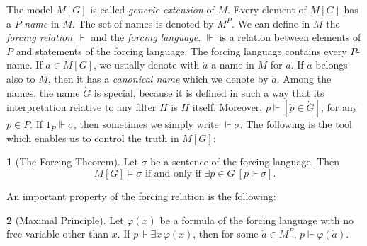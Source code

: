 \documentclass[11pt,a4paper]{report}
\theoremstyle{definition}
\theoremstyle{num.custom-title}
\theoremstyle{custom-title}
\newtheorem*{teo_custom-title_nonum}{}
\renewcommand{\phi}{\varphi}
\newcommand{\forces}{\Vdash}
\begin{document}
The model $M[G]$ is called \emph{generic extension} of $M$. Every element of $M[G]$ has a $P$-\emph{name} in $M$. The set of names is denoted by $M^P$. We can define in $M$ the \emph{forcing relation} $\forces$ and the \emph{forcing language}. $\forces$ is a relation between elements of $P$ and statements of the forcing language. The forcing language contains every $P$-name. If $a \in M[G]$, we usually denote with $\dot{a}$ a name in $M$ for $a$. If $a$ belongs also to $M$, then it has a \emph{canonical name} which we denote by $\check{a}$. Among the names, the name $\dot{G}$ is special, because it is defined in such a way that its interpretation relative to any filter $H$ is $H$ itself. Moreover, $p \forces [\check{p} \in \dot{G}]$, for any $p \in P$. If $1_P \forces \sigma$, then sometimes we simply write $\forces \sigma$. The following is the tool which enables us to control the truth in $M[G]$:

\begin{teo_custom-title_nonum}[The Forcing Theorem]
Let $\sigma$ be a sentence of the forcing language. Then
\[
M[G] \models \sigma \text{ if and only if } \exists p \in G \ [p \forces \sigma].
\]
\end{teo_custom-title_nonum}

An important property of the forcing relation is the following:
\begin{teo_custom-title_nonum}[Maximal Principle]
Let $\phi(x)$ be a formula of the forcing language with no free variable other than $x$. If $p \forces \exists x \, \phi(x)$, then for some $\dot{a} \in M^P$, $p \forces \phi(\dot{a})$.
\end{teo_custom-title_nonum}
\end{document}
